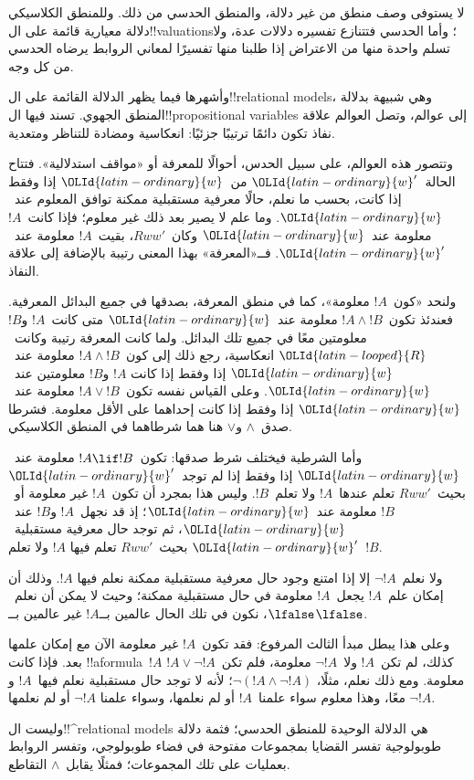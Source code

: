 \documentclass[../../../include/open-logic-section]{subfiles}
\begin{document}


لا يستوفى وصف منطق من غير دلالة، والمنطق الحدسي من ذلك. وللمنطق الكلاسيكي
دلالة معيارية قائمة على ال!!{valuation}s؛ وأما الحدسي فتتنازع تفسيره
دلالات عدة، ولا تسلم واحدة منها من الاعتراض إذا طلبنا منها تفسيرًا لمعاني
الروابط يرضاه الحدسي من كل وجه.

وأشهرها فيما يظهر الدلالة القائمة على ال!!{relational model}s، وهي شبيهة
بدلالة المنطق الجهوي. تسند فيها ال!!{propositional variable}s إلى عوالم،
وتصل العوالم علاقة نفاذ تكون دائمًا ترتيبًا جزئيًا: انعكاسية ومضادة للتناظر
ومتعدية.

وتتصور هذه العوالم، على سبيل الحدس، أحوالًا للمعرفة أو «مواقف استدلالية».
فتتاح الحالة~$\OLId{latin-ordinary}{w}'$ من~$\OLId{latin-ordinary}{w}$ إذا وفقط إذا كانت، بحسب ما نعلم، حالًا معرفية
مستقبلية ممكنة توافق المعلوم عند~$\OLId{latin-ordinary}{w}$. وما علم لا يصير بعد ذلك غير معلوم؛
فإذا كانت~$!A$ معلومة عند~$\OLId{latin-ordinary}{w}$ وكان~$Rww'$، بقيت~$!A$ معلومة عند~$\OLId{latin-ordinary}{w}'$.
فــ«المعرفة» بهذا المعنى رتيبة بالإضافة إلى علاقة النفاذ.

ولنحد «كون~$!A$ معلومة»، كما في منطق المعرفة، بصدقها في جميع البدائل
المعرفية. فعندئذ تكون~$!A \land !B$ معلومة عند~$\OLId{latin-ordinary}{w}$ متى كانت~$!A$ و$!B$
معلومتين معًا في جميع تلك البدائل. ولما كانت المعرفة رتيبة وكانت~$\OLId{latin-looped}{R}$
انعكاسية، رجع ذلك إلى كون~$!A \land !B$ معلومة عند~$\OLId{latin-ordinary}{w}$ إذا وفقط إذا كانت
$!A$ و$!B$ معلومتين عند~$\OLId{latin-ordinary}{w}$. وعلى القياس نفسه تكون~$!A \lor !B$ معلومة
عند~$\OLId{latin-ordinary}{w}$ إذا وفقط إذا كانت إحداهما على الأقل معلومة. فشرطا صدق~$\land$
و$\lor$ هنا هما شرطاهما في المنطق الكلاسيكي.

وأما الشرطية فيختلف شرط صدقها: تكون~$!A \lif !B$ معلومة عند~$\OLId{latin-ordinary}{w}$ إذا وفقط
إذا لم توجد~$\OLId{latin-ordinary}{w}'$ بحيث~$Rww'$ تعلم عندها~$!A$ ولا تعلم~$!B$. وليس هذا
بمجرد أن تكون~$!A$ غير معلومة أو~$!B$ معلومة عند~$\OLId{latin-ordinary}{w}$؛ إذ قد نجهل~$!A$
و$!B$ عند~$\OLId{latin-ordinary}{w}$، ثم توجد حال معرفية مستقبلية~$\OLId{latin-ordinary}{w}'$ بحيث~$Rww'$ تعلم فيها
$!A$ ولا تعلم~$!B$.

ولا نعلم~$\lnot !A$ إلا إذا امتنع وجود حال معرفية مستقبلية ممكنة نعلم فيها
$!A$. وذلك أن إمكان علم~$!A$ يجعل~$!A$ معلومة في حال مستقبلية ممكنة؛ وحيث
لا يمكن أن نعلم~$\lfalse$، نكون في تلك الحال عالمين بــ$!A$ غير عالمين
بــ$\lfalse$.

وعلى هذا يبطل مبدأ الثالث المرفوع: فقد تكون~$!A$ غير معلومة الآن مع إمكان
علمها بعد. فإذا كانت !!a{formula}~$!A$ كذلك، لم تكن~$!A$ ولا~$\lnot !A$
معلومة، فلم تكن~$!A \lor \lnot !A$ معلومة. ومع ذلك نعلم، مثلًا،
$\lnot(!A \land \lnot !A)$؛ لأنه لا توجد حال مستقبلية نعلم فيها~$!A$
و$\lnot !A$ معًا، وهذا معلوم سواء علمنا~$!A$ أو لم نعلمها، وسواء علمنا
$\lnot !A$ أو لم نعلمها.

وليست ال!!^{relational model}s هي الدلالة الوحيدة للمنطق الحدسي؛ فثمة
دلالة طوبولوجية تفسر القضايا بمجموعات مفتوحة في فضاء طوبولوجي، وتفسر
الروابط بعمليات على تلك المجموعات؛ فمثلًا يقابل~$\land$ التقاطع.
\end{document}
